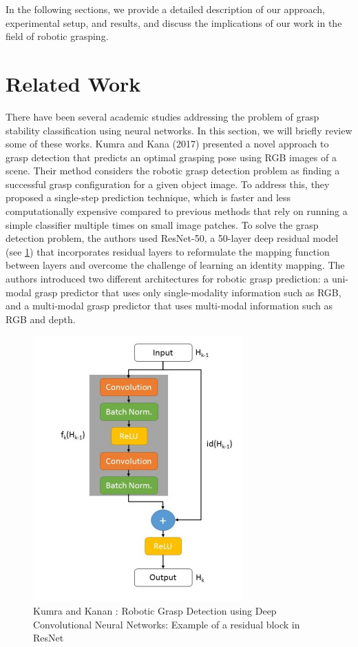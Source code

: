 \documentclass[11pt, a4paper]{report}
\begin{document}
In the following sections, we provide a detailed description of our approach, experimental setup, and results, and discuss the implications of our work in the field of robotic grasping.


\section{Related Work}\label{sec:5.1}
There have been several academic studies addressing the problem of grasp stability classification using neural networks. In this section, we will briefly review some of these works. Kumra and Kana (2017) \cite{8202237} presented a novel approach to grasp detection that predicts an optimal grasping pose using RGB images of a scene. Their method considers the robotic grasp detection problem as finding a successful grasp configuration for a given object image. To address this, they proposed a single-step prediction technique, which is faster and less computationally expensive compared to previous methods that rely on running a simple classifier multiple times on small image patches. To solve the grasp detection problem, the authors used ResNet-50, a 50-layer deep residual model (see \ref{fig:5.1}) that incorporates residual layers to reformulate the mapping function between layers and overcome the challenge of learning an identity mapping. The authors introduced two different architectures for robotic grasp prediction: a uni-modal grasp predictor that uses only single-modality information such as RGB, and a multi-modal grasp predictor that uses multi-modal information such as RGB and depth.\\
\begin{figure}[ht]
    \centering
    \includegraphics{docs/Project Report/Media/kumra_kana_2017_residual_block.png}
    \caption{Kumra and Kanan \cite{8202237}: Robotic Grasp Detection using Deep Convolutional Neural Networks: Example of a residual block in ResNet}
    \label{fig:5.1}
\end{figure}
\end{document}
